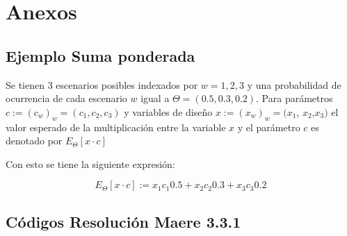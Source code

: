 
\chapter{Anexos}
\label{}



\section{Ejemplo Suma ponderada}\label{ej:sumapond}

Se tienen 3 escenarios posibles indexados por $w = 1,2,3$ y una probabilidad de ocurrencia de cada escenario $w$ igual a $\Theta =(0.5 , 0.3 ,0.2 )$. Para parámetros $c:=(c_{w})_w=(c_1,c_2,c_3)$ y variables de diseño $x:=(x_{w})_w=(x_{1}$, $x_{2}$,$x_{3})$ el valor esperado de la multiplicación entre la variable $x$ y el parámetro $c$ es denotado por $E_{\Theta}[x\cdot c]$
\vspace{2.5mm}

Con esto se tiene la siguiente expresión:

$$E_{\Theta} [ x\cdot c] := x_{1}c_{1}0.5 + x_{2}c_{2}0.3 + x_{3}c_{3}0.2 $$

\section{Códigos Resolución Maere 3.3.1}

